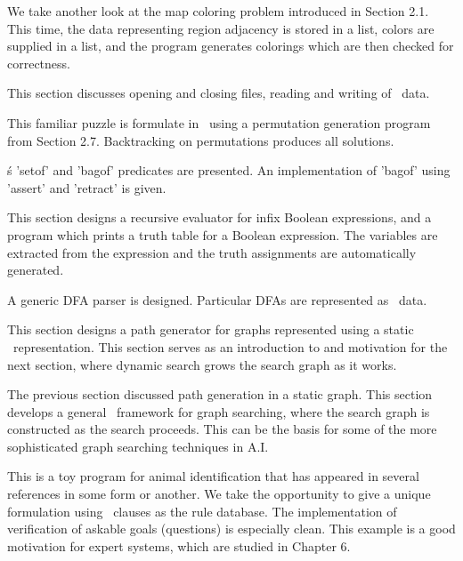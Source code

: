 We take another look at the map coloring problem introduced in Section 2.1. This
time, the data representing region adjacency is stored in a list, colors are
supplied in a list, and the program generates colorings which are then checked
for correctness.


This section discusses opening and closing files, reading and writing of \prolog\
data.
 

This familiar puzzle is formulate in \prolog\ using a permutation generation
program from Section 2.7. Backtracking on permutations produces all solutions.
 

\prolog\'s 'setof' and 'bagof' predicates are presented. An implementation of
'bagof' using 'assert' and 'retract' is given.


This section designs a recursive evaluator for infix Boolean expressions, and a
program which prints a truth table for a Boolean expression. The variables are
extracted from the expression and the truth assignments are automatically
generated.


A generic DFA parser is designed. Particular DFAs are represented as \prolog\
data.
 

This section designs a path generator for graphs represented using a static
\prolog\ representation. This section serves as an introduction to and motivation
for the next section, where dynamic search grows the search graph as it works.
 
\secrel{2.16 Search} 

The previous section discussed path generation in a static graph. This section
develops a general \prolog\ framework for graph searching, where the search graph
is constructed as the search proceeds. This can be the basis for some of the
more sophisticated graph searching techniques in A.I.


This is a toy program for animal identification that has appeared in several
references in some form or another. We take the opportunity to give a unique
formulation using \prolog\ clauses as the rule database. The implementation of
verification of askable goals (questions) is especially clean. This example is a
good motivation for expert systems, which are studied in Chapter 6.

